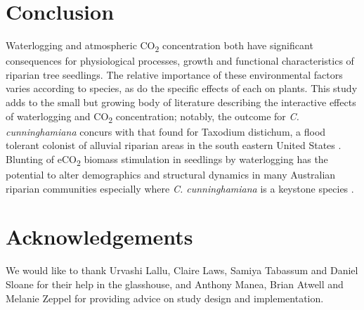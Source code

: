 \documentclass[openright,12pt,a4paper]{memoir}
\begin{document}
\section{Conclusion}
Waterlogging and atmospheric CO\textsubscript{2} concentration both have significant consequences for physiological processes, growth and functional characteristics of riparian tree seedlings. The relative importance of these environmental factors varies according to species, as do the specific effects of each on plants. This study adds to the small but growing body of literature describing the interactive effects of waterlogging and CO\textsubscript{2} concentration; notably, the outcome for \textit{C. cunninghamiana} concurs with that found for Taxodium distichum, a flood tolerant colonist of alluvial riparian areas in the south eastern United States \citep{Megonigal2005}. Blunting of eCO\textsubscript{2} biomass stimulation in seedlings by waterlogging has the potential to alter demographics and structural dynamics in many Australian riparian communities especially where \textit{C. cunninghamiana} is a keystone species \citep{Woolfrey2001}.

\section*{Acknowledgements}
We would like to thank Urvashi Lallu, Claire Laws, Samiya Tabassum and Daniel Sloane for their help in the glasshouse, and Anthony Manea, Brian Atwell and Melanie Zeppel for providing advice on study design and implementation.
\renewcommand\bibname{{References}} 
\begin{small}


\end{small}
\end{document}

